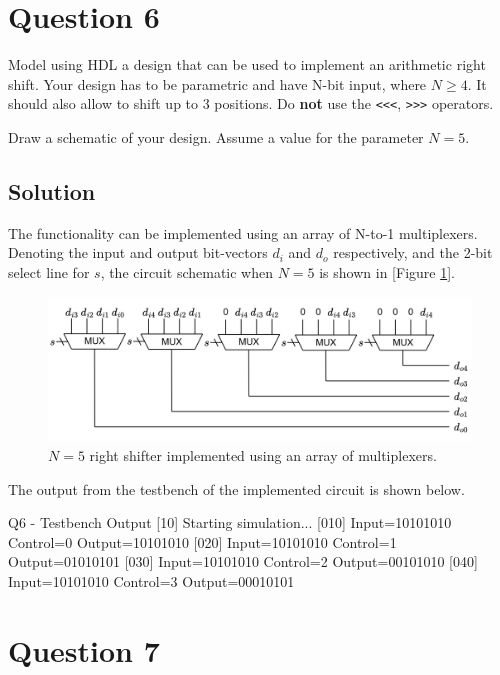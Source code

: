 \documentclass[../main.tex]{subfiles}
\begin{document}
\section{Question 6}

Model using HDL a design that can be used to implement an arithmetic right shift. Your design has to be parametric and have N-bit input, where $N \geq 4$. It should also allow to shift up to 3 positions. Do \textbf{not} use the \texttt{<<<}, \texttt{>>>} operators.

Draw a schematic of your design. Assume a value for the parameter $N = 5$.

\subsection*{Solution}

The functionality can be implemented using an array of N-to-1 multiplexers. Denoting the input and output bit-vectors $d_i$ and $d_o$ respectively, and the 2-bit select line for $s$, the circuit schematic when $N = 5$ is shown in [Figure \ref{q6}].

\begin{figure}[h]
    \centering
    \includegraphics[width=1.0\linewidth]{assets/q6.png}
    \caption{$N = 5$ right shifter implemented using an array of multiplexers.}
    \label{q6}
\end{figure}

The output from the testbench of the implemented circuit is shown below.

\begin{mintedterminal}{Q6 - Testbench Output}
[10] Starting simulation...
[010] Input=10101010 Control=0 Output=10101010
[020] Input=10101010 Control=1 Output=01010101
[030] Input=10101010 Control=2 Output=00101010
[040] Input=10101010 Control=3 Output=00010101
\end{mintedterminal}

\newpage

\section{Question 7}
\end{document}

